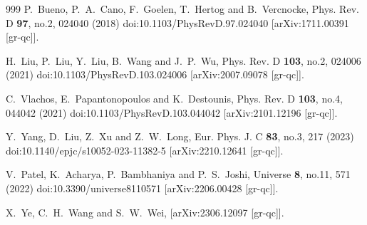 \documentclass[aps,preprint,groupedaddress,nofootinbib,superscriptaddress,showkeys,showpacs,eqsecnum,amsmath,amssymb]{revtex4-1}
\begin{document}
\begin{thebibliography}{999}
P.~Bueno, P.~A.~Cano, F.~Goelen, T.~Hertog and B.~Vercnocke,
Phys. Rev. D \textbf{97}, no.2, 024040 (2018)
doi:10.1103/PhysRevD.97.024040
[arXiv:1711.00391 [gr-qc]].

H.~Liu, P.~Liu, Y.~Liu, B.~Wang and J.~P.~Wu,
Phys. Rev. D \textbf{103}, no.2, 024006 (2021)
doi:10.1103/PhysRevD.103.024006
[arXiv:2007.09078 [gr-qc]].

C.~Vlachos, E.~Papantonopoulos and K.~Destounis,
Phys. Rev. D \textbf{103}, no.4, 044042 (2021)
doi:10.1103/PhysRevD.103.044042
[arXiv:2101.12196 [gr-qc]].

Y.~Yang, D.~Liu, Z.~Xu and Z.~W.~Long,
Eur. Phys. J. C \textbf{83}, no.3, 217 (2023)
doi:10.1140/epjc/s10052-023-11382-5
[arXiv:2210.12641 [gr-qc]].


V.~Patel, K.~Acharya, P.~Bambhaniya and P.~S.~Joshi,
Universe \textbf{8}, no.11, 571 (2022)
doi:10.3390/universe8110571
[arXiv:2206.00428 [gr-qc]].


X.~Ye, C.~H.~Wang and S.~W.~Wei,
[arXiv:2306.12097 [gr-qc]].

























\end{thebibliography}
\end{document}
